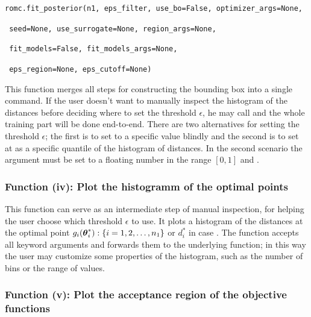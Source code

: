 \texttt{romc.fit_posterior(n1, eps_filter, use_bo=False, optimizer_args=None,}
  
          \texttt{                seed=None, use_surrogate=None, region_args=None,}
  
          \texttt{                fit_models=False, fit_models_args=None,}
  
          \texttt{                eps_region=None, eps_cutoff=None)}

\vspace{5mm}
\noindent

This function merges all steps for constructing the bounding box into
a single command. If the user doesn't want to manually inspect the
histogram of the distances before deciding where to set the threshold
$\epsilon$, he may call  and the whole
training part will be done end-to-end. There are two alternatives for
setting the threshold $\epsilon$; the first is to set to a specific
value blindly and the second is to set at as a specific quantile of
the histogram of distances. In the second scenario the
 argument must be set to a floating number in the
range $[0,1]$ and .


\subsubsection*{Function (iv): Plot the histogramm of the optimal points}

\vspace{5mm}
\noindent


This function can serve as an intermediate step of manual inspection,
for helping the user choose which threshold $\epsilon$ to use. It
plots a histogram of the distances at the optimal point
$g_i(\boldsymbol{\theta}_i^*) : \{i = 1, 2, \ldots, n_1\}$ or
$d_i^*$ in case . The function accepts all
keyword arguments and forwards them to the underlying
 function; in this way the user may
customize some properties of the histogram, such as the number of bins
or the range of values.

\subsubsection*{Function (v): Plot the acceptance region of the objective functions}

\vspace{5mm}
\noindent

